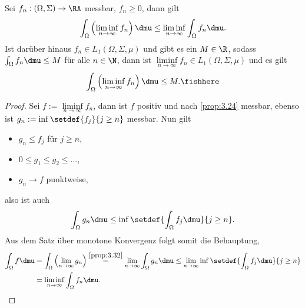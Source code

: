 \begin{lem}
\label{prop:3.36}
Sei $f_n:(\Omega,\Sigma)\to\RA$ messbar, $f_n\ge 0$, dann gilt
\begin{align*}
\int_\Omega \left(\liminf\limits_{n\to\infty} f_n \right) \dmu
\le \liminf\limits_{n\to\infty} \int_\Omega f_n \dmu.
\end{align*}
Ist darüber hinaus $f_n\in L_1(\Omega,\Sigma,\mu)$ und gibt es ein $M\in\R$,
sodass $\int_\Omega f_n \dmu \le M$ für alle $n\in\N$, dann ist
$\liminf\limits_{n\to\infty} f_n\in L_1(\Omega,\Sigma,\mu)$ und es gilt
\begin{align*}
\int_\Omega \left(\liminf\limits_{n\to\infty} f_n \right) \dmu \le M.\fishhere
\end{align*}
\end{lem}
\begin{proof}
Sei $f := \liminf\limits_{n\to\infty} f_n$, dann ist $f$ positiv und nach
\ref{prop:3.24} messbar, ebenso ist $g_n := \inf\setdef{f_j}{j\ge n}$ messbar.
Nun gilt
\begin{itemize}
  \item $g_n\le f_j$ für $j\ge n$,
  \item $0\le g_1\le g_2 \le \ldots$,
  \item $g_n\to f$ punktweise,
\end{itemize}
also ist auch
\begin{align*}
\int_\Omega g_n\dmu \le \inf\setdef{\int_\Omega f_j \dmu}{j\ge n}.
\end{align*}
Aus dem Satz über monotone Konvergenz folgt somit die Behauptung,
\begin{align*}
\int_\Omega f\dmu &= \int_\Omega \left(\lim\limits_{n\to\infty} g_n \right)
\overset{\ref{prop:3.32}}{=} \lim\limits_{n\to\infty}  \int_\Omega g_n\dmu
\le \lim\limits_{n\to\infty} \inf \setdef{\int_\Omega f_j \dmu}{j\ge n}
\\ &= \liminf\limits_{n\to\infty} \int_\Omega f_n\dmu.\qedhere
\end{align*}
\end{proof}

